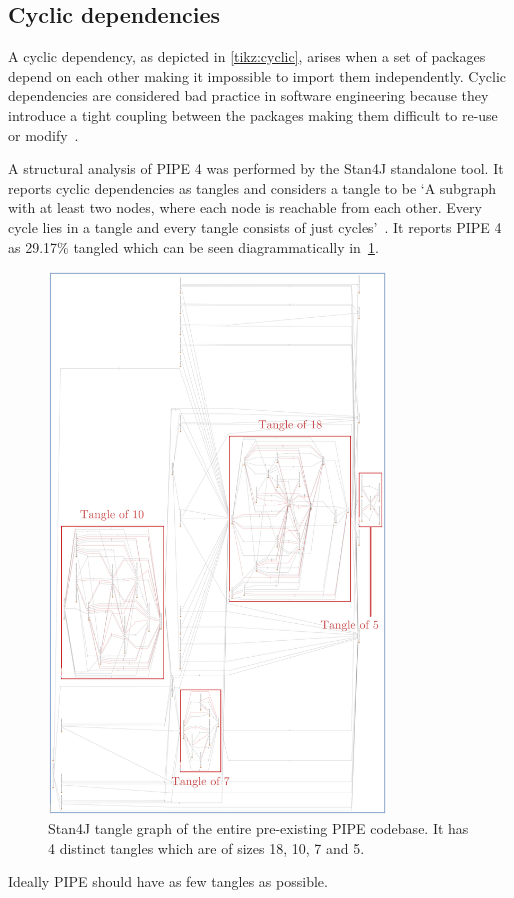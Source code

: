 \subsection{Cyclic dependencies}
A cyclic dependency, as depicted in \cref{tikz:cyclic}, arises when a set of packages depend on each other making it impossible to import them independently. Cyclic dependencies are considered bad practice in software engineering because they introduce a tight coupling between the packages making them difficult to re-use or modify~\cite{whats_wrong_with_circular_references}.



A structural analysis of PIPE 4 was performed by the Stan4J standalone tool. It reports cyclic dependencies as tangles and considers a tangle to be `A subgraph with at least two nodes, where each node is reachable from each other. Every cycle lies in a tangle and every tangle consists of just cycles'~\cite{stan_whitepaper}. It reports PIPE 4 as 29.17\% tangled which can be seen diagrammatically in~\cref{fig:tangle}.

\begin{figure}[p]
\begin{center}
    \includegraphics[width=0.8\textwidth]{analysis/tangle_annotated.png} 
    \caption{Stan4J tangle graph of the entire pre-existing PIPE codebase. It has 4 distinct tangles which are of sizes 18, 10, 7 and 5.}
    \label{fig:tangle}
\end{center}
\end{figure}

% 

Ideally PIPE should have as few tangles as possible.